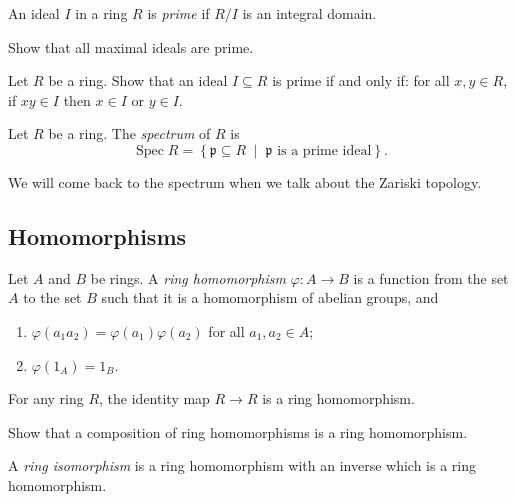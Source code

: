 \documentclass[a4paper,11pt]{article}
\begin{document}
    \begin{definition}
      An ideal \(I\) in a ring \(R\) is \emph{prime} if \(R/I\) is an integral domain.
    \end{definition}

    \begin{exercise}
      Show that all maximal ideals are prime.
    \end{exercise}

    \begin{exercise}
      Let \(R\) be a ring. Show that an ideal \(I \subseteq R\) is prime if and only if: for all \(x,y \in R\), if \(xy \in I\) then \(x \in I\) or \(y \in I\).
    \end{exercise}

    \begin{definition}
      Let \(R\) be a ring. The \emph{spectrum} of \(R\) is
      \[
        \operatorname{Spec}R = \left\{ \mathfrak{p} \subseteq R\; \middle| \; \mathfrak{p}\text{ is a prime ideal} \right\}.
      \]
    \end{definition}
    We will come back to the spectrum when we talk about the Zariski topology.

    \subsection{Homomorphisms}
    \begin{definition}
      Let \(A\) and \(B\) be rings. A \emph{ring homomorphism} \(\varphi: A \to B\) is a function from the set \(A\) to the set \(B\) such that it is a homomorphism of abelian groups, and
      \begin{enumerate}[label=(\roman*)]
        \item \(\varphi(a_1 a_2) = \varphi(a_1)\varphi(a_2)\) for all \(a_1,a_2 \in A\);
        \item \(\varphi(1_A) = 1_B\).
      \end{enumerate}
    \end{definition}

    \begin{example}
      For any ring \(R\), the identity map \(R \to R\) is a ring homomorphism.
    \end{example}

    \begin{exercise}
      Show that a composition of ring homomorphisms is a ring homomorphism.
    \end{exercise}

    \begin{definition}
      A \emph{ring isomorphism} is a ring homomorphism with an inverse which is a ring homomorphism.
    \end{definition}
    
\end{document}

